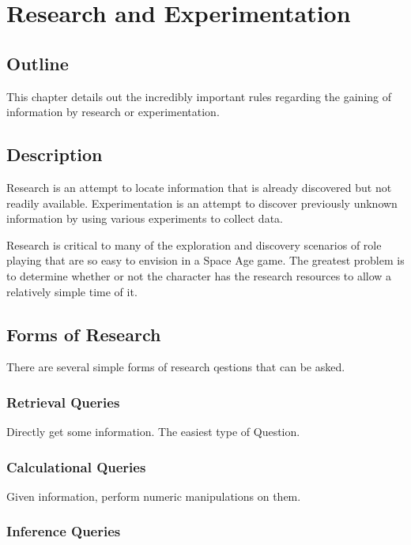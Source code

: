 \chapter{Research and Experimentation}

\section{Outline}

This chapter details out the incredibly important rules regarding the 
gaining of information by research or experimentation.
\section{Description}

Research is an attempt to locate information that is 
already discovered but not readily available. Experimentation is an 
attempt to discover previously unknown information by using various 
experiments to collect data.

Research is critical to many of the exploration and discovery 
scenarios of role playing that are so easy to envision in a Space Age 
game. The greatest problem is to determine whether or not the 
character has the research resources to allow a relatively simple 
time of it.

\section{Forms of Research}

There are several simple forms of research qestions that can be 
asked.

\subsection{Retrieval Queries}

Directly get some information. The easiest type of Question. 

\subsection{Calculational Queries}

Given information, perform numeric manipulations on them.

\subsection{Inference Queries}

